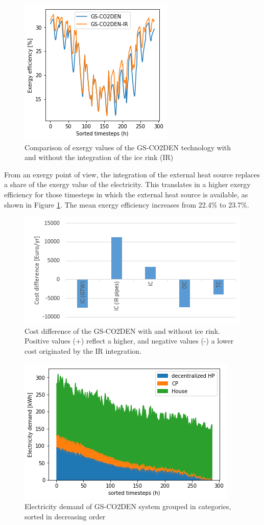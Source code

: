 \documentclass{article}
\begin{document}
\begin{figure}[tph]
	\centering
	\includegraphics[width=0.45\linewidth]{Images/V_IR_exe}
	\caption{Comparison of exergy values of the GS-CO2DEN technology with and without the integration of the ice rink (IR)}
	\label{fig:virexe}
\end{figure}

From an exergy point of view, the integration of the external heat source replaces a share of the exergy value of the electricity. This translates in a higher exergy efficiency for those timesteps in which the external heat source is available, as shown in Figure \ref{fig:virexe}. The mean exergy efficiency increases from 22.4\% to 23.7\%.

\begin{figure}[tph]
	\centering
	\includegraphics[width=0.7\linewidth]{Images/V_IR_cost}
	\caption{Cost difference of the GS-CO2DEN with and without ice rink. Positive values (+) reflect a higher, and negative values (-) a lower cost originated by the IR integration.}
	\label{fig:V_IR_cost}
\end{figure}


\begin{figure}[tph]
	\centering
	\includegraphics[width=0.5\linewidth]{Images/V_CO2_eldem_sorted}
	\caption{Electricity demand of GS-CO2DEN system grouped in categories, sorted in decreasing order}
	\label{fig:gsco2_el}
\end{figure}
\end{document}
